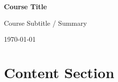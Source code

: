 \documentclass[12pt,a4paper]{article}
\begin{document}
\begin{titlepage}
  \centering
  \vspace*{3cm}
  {\Huge\bfseries\sffamily Course Title\par}
  \vspace{1.5cm}
  {\Large Course Subtitle / Summary\par}
  \vspace{2cm}
  \vfill
  {\large \today\par}
\end{titlepage}

\newpage
\tableofcontents
\newpage

\section{Content Section}
\end{document}
